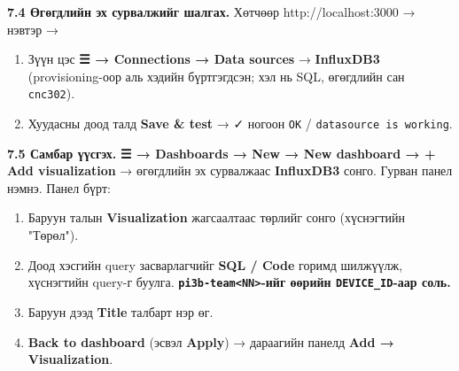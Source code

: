 \textbf{7.4 Өгөгдлийн эх сурвалжийг шалгах.} Хөтчөөр http://localhost:3000 → нэвтэр →

\begin{enumerate}
\def\labelenumi{\arabic{enumi}.}
\tightlist
\item
  Зүүн цэс \textbf{☰ → Connections → Data sources} → \textbf{InfluxDB3} (provisioning-оор аль хэдийн бүртгэгдсэн; хэл нь SQL, өгөгдлийн сан \texttt{cnc302}).
\item
  Хуудасны доод талд \textbf{Save \& test} → ✓ ногоон \texttt{OK} / \texttt{datasource\ is\ working}.
\end{enumerate}

\textbf{7.5 Самбар үүсгэх.} \textbf{☰ → Dashboards → New → New dashboard → + Add visualization} → өгөгдлийн эх сурвалжаас \textbf{InfluxDB3} сонго. Гурван панел нэмнэ. Панел бүрт:

\begin{enumerate}
\def\labelenumi{\arabic{enumi}.}
\tightlist
\item
  Баруун талын \textbf{Visualization} жагсаалтаас төрлийг сонго (хүснэгтийн "Төрөл").
\item
  Доод хэсгийн query засварлагчийг \textbf{SQL / Code} горимд шилжүүлж, хүснэгтийн query-г буулга. \textbf{\texttt{pi3b-team\textless{}NN\textgreater{}}-ийг өөрийн \texttt{DEVICE\_ID}-аар соль.}
\item
  Баруун дээд \textbf{Title} талбарт нэр өг.
\item
  \textbf{Back to dashboard} (эсвэл \textbf{Apply}) → дараагийн панелд \textbf{Add → Visualization}.
\end{enumerate}

